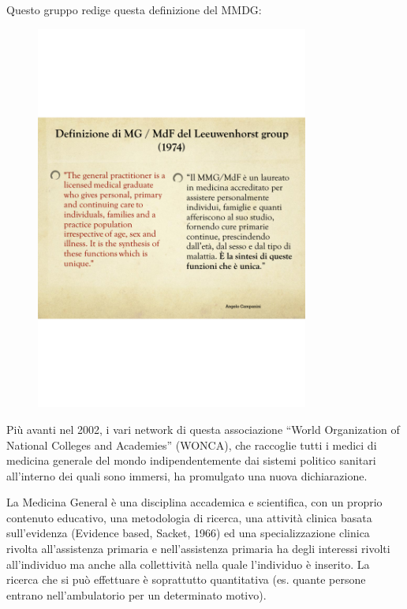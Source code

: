 Questo gruppo redige questa definizione del MMDG:

\begin{figure}[!ht]
\centering
	\includegraphics[width=0.8\textwidth]{38/image7.png}
	\end{figure}
	
Più avanti nel 2002, i vari network di questa associazione ``World
Organization of National Colleges and Academies'' (WONCA), che raccoglie
tutti i medici di medicina generale del mondo indipendentemente dai
sistemi politico sanitari all'interno dei quali sono immersi, ha
promulgato una nuova dichiarazione.

La Medicina General è una disciplina accademica e scientifica, con un
proprio contenuto educativo, una metodologia di ricerca, una attività
clinica basata sull'evidenza (Evidence based, Sacket, 1966) ed una
specializzazione clinica rivolta all'assistenza primaria e
nell'assistenza primaria ha degli interessi rivolti all'individuo ma
anche alla collettività nella quale l'individuo è inserito. La ricerca
che si può effettuare è soprattutto quantitativa (es. quante persone
entrano nell'ambulatorio per un determinato motivo).

